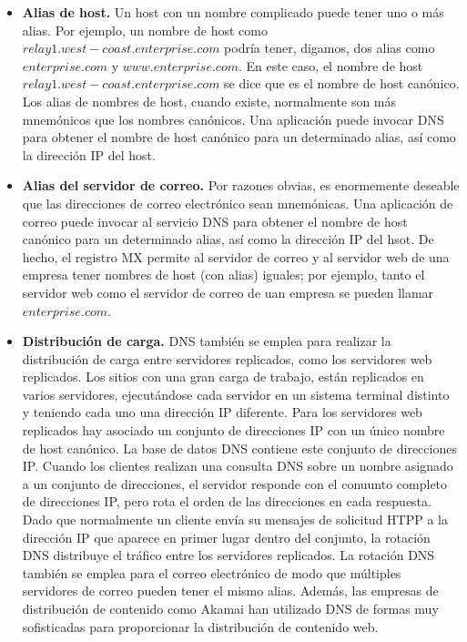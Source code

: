 \documentclass[a4paper,11pt]{article}
\begin{document}
\begin{itemize}
\item \textbf{Alias de host.} Un host con un nombre complicado puede tener uno o más alias. Por ejemplo, un nombre de host como $relay1.west-coast.enterprise.com$ podría tener, digamos, dos alias como $enterprise.com$ y $www.enterprise.com$. En este caso, el nombre de host $relay1.west-coast.enterprise.com$ se dice que es el nombre de host canónico. Los alias de nombres de host, cuando existe, normalmente son más mnemónicos que los nombres canónicos. Una aplicación puede invocar DNS para obtener el nombre de host canónico para un determinado alias, así como la dirección IP del host.

\item \textbf{Alias del servidor de correo.} Por razones obvias, es enormemente deseable que las direcciones de correo electrónico sean mnemónicas. Una aplicación de correo puede invocar al servicio DNS para obtener el nombre de host canónico para un determinado alias, así como la dirección IP del hsot. De hecho, el registro MX permite al servidor de correo y al servidor web de una empresa tener nombres de host (con alias) iguales; por ejemplo, tanto el servidor web como el servidor de correo de uan empresa se pueden llamar $enterprise.com$.

\item \textbf{Distribución de carga.} DNS también se emplea para realizar la distribución de carga entre servidores replicados, como los servidores web replicados. Los sitios con una gran carga de trabajo, están replicados en varios servidores, ejecutándose cada servidor en un sistema terminal distinto y teniendo cada uno una dirección IP diferente. Para los servidores web replicados hay asociado un conjunto de direcciones IP con un único nombre de host canónico. La base de datos DNS contiene este conjunto de direcciones IP. Cuando los clientes realizan una consulta DNS sobre un nombre asignado a un conjunto de direcciones, el servidor responde con el conuunto completo de direcciones IP, pero rota el orden de las direcciones en cada respuesta. Dado que normalmente un cliente envía su mensajes de solicitud HTPP a la dirección IP que aparece en primer lugar dentro del conjunto, la rotación DNS distribuye el tráfico entre los servidores replicados. La rotación DNS también se emplea para el correo electrónico de modo que múltiples servidores de correo pueden tener el mismo alias. Además, las empresas de distribución de contenido como Akamai han utilizado DNS de formas muy sofisticadas para proporcionar la distribución de contenido web.
\end{itemize}
\end{document}
